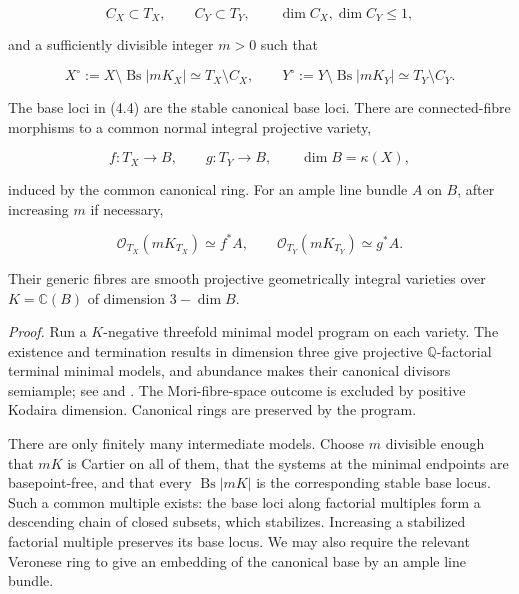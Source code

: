 \documentclass[11pt,a4paper]{article}
\begin{document}
\begin{equation*}
C_X\subset T_X,\qquad C_Y\subset T_Y,
\qquad \dim C_X,\dim C_Y\leq1,
\end{equation*}

and a sufficiently divisible integer $m>0$ such that

\begin{equation*}
X^\circ:=X\setminus\operatorname{Bs}|mK_X|
\simeq T_X\setminus C_X,
\qquad
Y^\circ:=Y\setminus\operatorname{Bs}|mK_Y|
\simeq T_Y\setminus C_Y.
\tag{4.4}
\end{equation*}

The base loci in (4.4) are the stable canonical base loci. There are connected-fibre morphisms to a common normal integral projective variety,

\begin{equation*}
f:T_X\longrightarrow B,
\qquad
g:T_Y\longrightarrow B,
\qquad
\dim B=\kappa(X),
\tag{4.5}
\end{equation*}

induced by the common canonical ring. For an ample line bundle $A$ on $B$, after increasing $m$ if necessary,

\begin{equation*}
\mathcal O_{T_X}(mK_{T_X})\simeq f^*A,
\qquad
\mathcal O_{T_Y}(mK_{T_Y})\simeq g^*A.
\tag{4.6}
\end{equation*}

Their generic fibres are smooth projective geometrically integral varieties over $K=\mathbb C(B)$ of dimension $3-\dim B$.

\noindent \emph{Proof.} Run a $K$-negative threefold minimal model program on each variety. The existence and termination results in dimension three give projective $\mathbb Q$-factorial terminal minimal models, and abundance makes their canonical divisors semiample; see \cite{FA92} and \cite{Kaw92}. The Mori-fibre-space outcome is excluded by positive Kodaira dimension. Canonical rings are preserved by the program.

There are only finitely many intermediate models. Choose $m$ divisible enough that $mK$ is Cartier on all of them, that the systems at the minimal endpoints are basepoint-free, and that every $\operatorname{Bs}|mK|$ is the corresponding stable base locus. Such a common multiple exists: the base loci along factorial multiples form a descending chain of closed subsets, which stabilizes. Increasing a stabilized factorial multiple preserves its base locus. We may also require the relevant Veronese ring to give an embedding of the canonical base by an ample line bundle.
\end{document}
